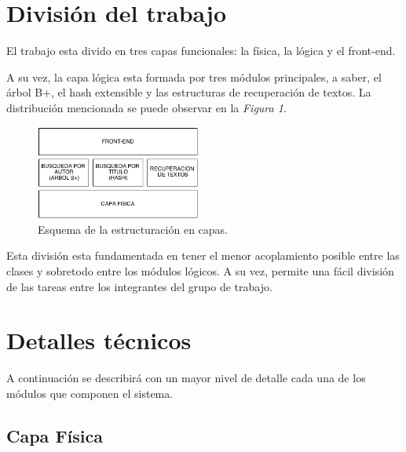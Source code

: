 \documentclass{article}
\begin{document}
\section{División del trabajo}

	El trabajo esta divido en tres capas funcionales: la física, la lógica y el front-end.
	\par
	A su vez, la capa lógica esta formada por tres módulos principales, a saber, el árbol B+, el hash extensible y las estructuras de recuperación de textos. La distribución mencionada se puede observar en la \textit{Figura 1}.
	\bigskip\medskip


\begin{figure}[h]
	\centering
	\includegraphics[width=0.48\textwidth]{images/DivisionModulos.png}
	\medskip
	\caption{Esquema de la estructuración en capas.}
\end{figure}
\bigskip\smallskip


	Esta división esta fundamentada en tener el menor acoplamiento posible entre las clases y sobretodo entre los módulos lógicos. A su vez, permite una fácil división de las tareas entre los integrantes del grupo de trabajo.
	\medskip




\section{Detalles técnicos}

	A continuación se describirá con un mayor nivel de detalle cada una de los módulos que componen el sistema.
\smallskip


\subsection{Capa Física}
	
\end{document}
